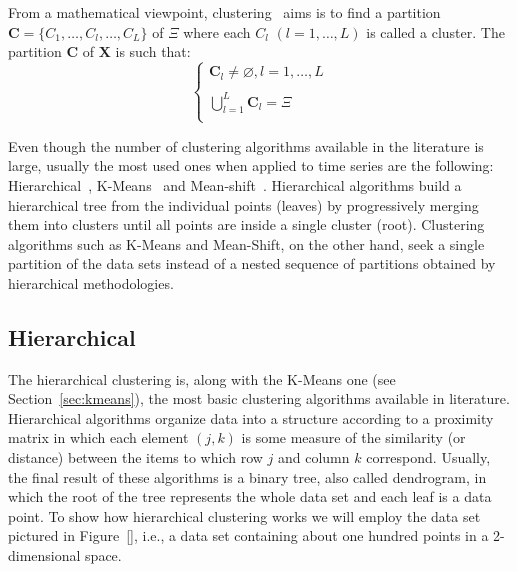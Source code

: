 From a mathematical viewpoint, clustering~\cite{SurveyClustering} aims is to find a partition
\begin{math} \mathbf{C}=\{C_{1},\ldots,C_{l},\ldots,{C_{L}}\}\end{math}
of $\Xi$ where each $C_{l}$ $(l=1,\ldots,L)$ is called a cluster. The partition
    $ \mathbf{C} $ of $ \mathbf{X} $
is such that:
    \begin{equation}\label{eq: ClassRequier}
        \begin{cases} \mathbf{C}_{l}\neq\varnothing, l=1,\ldots,L \\
                        \\
                     \bigcup_{l=1}^{L}\mathbf{C}_{l}= \Xi \\
        \end{cases}
    \end{equation}

Even though the number of clustering algorithms available in the literature is large, usually the most 
used ones when applied to time series are the following: Hierarchical~\cite{}, 
K-Means~\cite{} and Mean-shift~\cite{}.
Hierarchical algorithms build a hierarchical tree from the individual points (leaves) by progressively 
merging them into clusters until all points are inside a single cluster (root). 
Clustering algorithms such as K-Means and Mean-Shift, on the other hand, seek a single partition of 
the data sets instead of a nested sequence of partitions obtained by hierarchical methodologies. 

\subsection{Hierarchical}
\label{sec:hierarchical}

The hierarchical clustering is, along with the K-Means one (see Section~\ref{sec:kmeans}), the most basic 
clustering algorithms available in literature. Hierarchical algorithms organize data into a 
structure according to a proximity matrix in which each element $(j,k)$ is some measure of the 
similarity (or distance) between the items to which row $j$ and column $k$ correspond. 
Usually, the final result of these algorithms is a binary tree, also called dendrogram, 
in which the root of the tree represents the whole data set and each leaf is a data point. 
To show how hierarchical clustering works we will employ the data set pictured in 
Figure~\ref{}, i.e., a data set containing about one hundred points in a 2-dimensional space. 

